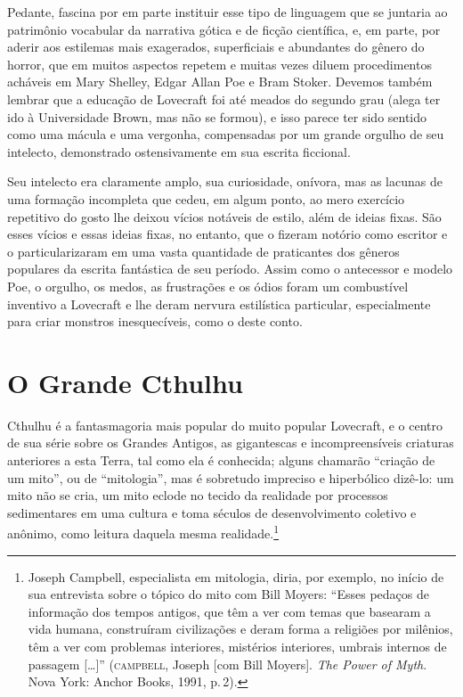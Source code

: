 Pedante, fascina por em parte instituir esse tipo de linguagem que se
juntaria ao patrimônio vocabular da narrativa gótica e de ficção
científica, e, em parte, por aderir aos estilemas mais exagerados,
superficiais e abundantes do gênero do horror, que em muitos aspectos
repetem e muitas vezes diluem procedimentos acháveis em Mary Shelley,
Edgar Allan Poe e Bram Stoker. Devemos também lembrar que a educação de
Lovecraft foi até meados do segundo grau (alega ter ido à Universidade
Brown, mas não se formou), e isso parece ter sido sentido como uma
mácula e uma vergonha, compensadas por um grande orgulho de seu
intelecto, demonstrado ostensivamente em sua escrita ficcional.

Seu intelecto era claramente amplo, sua curiosidade, onívora, mas as
lacunas de uma formação incompleta que cedeu, em algum ponto, ao mero
exercício repetitivo do gosto lhe deixou vícios notáveis de estilo, além de
ideias fixas. São esses vícios e essas ideias fixas, no entanto, que o
fizeram notório como escritor e o particularizaram em uma vasta
quantidade de praticantes dos gêneros populares da escrita fantástica de
seu período. Assim como o antecessor e modelo Poe, o orgulho, os medos,
as frustrações e os ódios foram um combustível inventivo a Lovecraft e lhe deram
nervura estilística particular, especialmente para criar monstros
inesquecíveis, como o deste conto.

\section{O Grande Cthulhu}

Cthulhu é a fantasmagoria mais popular do muito popular
Lovecraft, e o centro de sua série sobre os Grandes Antigos, as
gigantescas e incompreensíveis criaturas anteriores a esta Terra, tal
como ela é conhecida; alguns chamarão ``criação de um mito'', ou de 
``mitologia'', mas é sobretudo impreciso e hiperbólico dizê-lo: um mito
não se cria, um mito eclode no tecido da realidade por processos
sedimentares em uma cultura e toma séculos de desenvolvimento
coletivo e anônimo, como leitura daquela mesma realidade.\footnote{Joseph
  Campbell, especialista em mitologia, diria, por exemplo, no início de
  sua entrevista sobre o tópico do mito com Bill Moyers: ``Esses pedaços
  de informação dos tempos antigos, que têm a ver com temas que basearam
  a vida humana, construíram civilizações e deram forma a religiões por
  milênios, têm a ver com problemas interiores, mistérios interiores,
  umbrais internos de passagem [\ldots{}]'' (\textsc{campbell}, Joseph [com Bill
  Moyers]. \emph{The Power of Myth}. Nova York: Anchor Books, 1991, p.\,2).}

